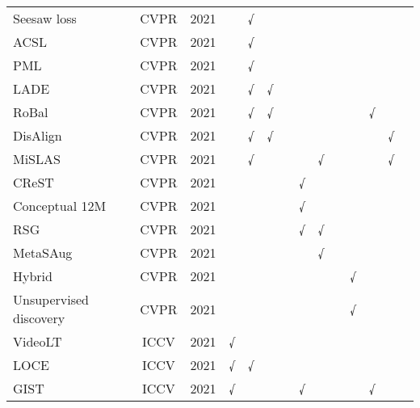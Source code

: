 \begin{table*}[htbp]
{\begin{tabular}{lccccccccccccc}
Seesaw loss \cite{Wang_2021_seesaw}  & CVPR  & 2021  &       & √     &       &       &       &       &       &       &       &       &  \\
ACSL \cite{Wang_2021_adap}  & CVPR  & 2021  &       & √     &       &       &       &       &       &       &       &       &  \\
PML \cite{Deng_2021}  & CVPR  & 2021  &       & √     &       &       &       &       &       &       &       &       &  \\
LADE \cite{Hong_2021}  & CVPR  & 2021  &       & √     & √     &       &       &       &       &       &       &       &  \\
RoBal \cite{Wu_2021_adve}  & CVPR  & 2021  &       & √     & √     &       &       &       &       &       & √     &       &  \\
DisAlign \cite{Zhang_2021_distr}  & CVPR  & 2021  &       & √     & √     &       &       &       &       &       &       & √     &  \\
MiSLAS \cite{Zhong_2021}  & CVPR  & 2021  &       & √     &       &       &       & √     &       &       &       & √     &  \\
CReST \cite{Wei_2021}  & CVPR  & 2021  &       &       &       &       & √     &       &       &       &       &       &  \\
Conceptual 12M \cite{Changpinyo_2021}  & CVPR  & 2021  &       &       &       &       & √     &       &       &       &       &       &  \\
RSG \cite{Wang_2021_rsg}  & CVPR  & 2021  &       &       &       &       & √     & √     &       &       &       &       &  \\
MetaSAug \cite{Li_2021_meta}  & CVPR  & 2021  &       &       &       &       &       & √     &       &       &       &       &  \\
Hybrid \cite{Wang_2021_cons}  & CVPR  & 2021  &       &       &       &       &       &       &       & √     &       &       &  \\
Unsupervised discovery \cite{Weng_2021}  & CVPR  & 2021  &       &       &       &       &       &       &       & √     &       &       &  \\
VideoLT \cite{Zhang_2021_video}  & ICCV  & 2021  & √     &       &       &       &       &       &       &       &       &       &  \\
LOCE \cite{Feng_2021}  & ICCV  & 2021  & √     & √     &       &       &       &       &       &       &       &       &  \\
GIST \cite{Liu_2021}  & ICCV  & 2021  & √     &       &       &       & √     &       &       &       & √     &       &  \\

\end{tabular}}
\end{table*}

